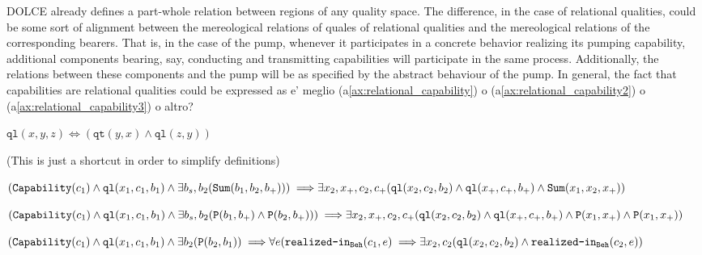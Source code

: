 \documentclass[crcready]{iosart2x}
\newcommand{\bflist}{\begin{list}{}{\setlength{\topsep}{2mm}\setlength{\partopsep}{0mm}\setlength{\parsep}{0mm}\setlength{\leftmargin}{9mm}\setlength{\labelwidth}{8mm}}}
\newcommand{\eflist}{\end{list}}
\newcommand{\AxLabel}{\textrm{a}}
\newcommand{\DefLabel}{\textrm{d}}
\newcounter{cntax}
\newcommand{\myax}[1]{\refstepcounter{cntax}\begin{small}{\bf \AxLabel\thecntax\label{ax:#1}}\end{small}}
\newcounter{cntdef}
\newcommand{\mydf}[1]{\refstepcounter{cntdef}\begin{small}{\bf \DefLabel\thecntdef\label{def:#1}}\end{small}}
\newcommand{\refax}[1]{({\AxLabel}\ref{#1})}
\newcommand{\generalStyle}[1]{\texttt{#1}}
\newcommand{\biRel}[3]{\generalStyle{#1}(#2,#3)}
\newcommand{\uniRel}[2]{\generalStyle{#1}(#2)}
\newcommand{\biRelPar}[4]{\generalStyle{#1}_{\generalStyle{#4}}(#2,#3)}
\newcommand{\triRel}[4]{\generalStyle{#1}(#2,#3,#4)}
\newcommand{\myiff}{\Longleftrightarrow}
\newcommand{\myfi}{\hspace{0.9mm} \Longrightarrow}
\newcommand{\DOLCE}{\textsc{DOLCE}\xspace} %
\newcommand{\DOLCEQualityDirect}[2]{\biRel{qt}{#1}{#2}}
\newcommand{\DOLCEQualeDirect}[2]{\biRel{{ql}}{#1}{#2}}
\newcommand{\DOLCEPart}[2]{\biRel{{P}}{#1}{#2}}
\newcommand{\DOLCESum}[3]{\triRel{Sum}{#1}{#2}{#3}}
\newcommand{\Capability}[1]{\uniRel{Capability}{#1}}
\newcommand{\realizedIn}[2]{\biRelPar{realized-in}{#1}{#2}{Beh}}
\newcommand{\behSum}[3]{\triRel{Sum}{#1}{#2}{#3}}
\newcommand{\DOLCEQualeTer}[3]{\triRel{ql}{#1}{#2}{#3}}
\newcommand{\TODO}[1]{{\color{red} #1}}
\begin{document}
\DOLCE already defines a part-whole relation between regions of 
any quality space. The difference, in the case of relational qualities, could be some sort of alignment between the mereological relations of quales of relational qualities and the mereological relations of the corresponding bearers. 
That is, in the case of the pump, whenever it participates in a concrete behavior realizing its pumping capability, additional components bearing, say, conducting and transmitting capabilities will participate in the same process. 
Additionally, the relations between these components and the pump will be as specified by the abstract behaviour of the pump. 
In general, the fact that capabilities are relational qualities could be expressed as \TODO{e' meglio \refax{ax:relational_capability} o \refax{ax:relational_capability2} o \refax{ax:relational_capability3} o altro?}
\bflist
 \item[\mydf{ternary_quale}] $ \DOLCEQualeTer{x}{y}{z} \myiff ( \DOLCEQualityDirect{y}{x} \land \DOLCEQualeDirect{z}{y} ) $
 \item[](This is just a shortcut in order to simplify definitions)
 {\color{red}
 \item[\myax{relational_capability}] $ (\Capability{c_1} \land \DOLCEQualeTer{x_1}{c_1}{b_1} \land \\ \exists b_s,b_2 (\behSum{b_1}{b_2}{b_+})) \myfi \\ \exists x_2,x_+,c_2,c_+ (\DOLCEQualeTer{x_2}{c_2}{b_2} \land \\ \DOLCEQualeTer{x_+}{c_+}{b_+} \land \DOLCESum{x_1}{x_2}{x_+})$ 
 \item[\myax{relational_capability2}] $ (\Capability{c_1} \land \DOLCEQualeTer{x_1}{c_1}{b_1} \land \\ \exists b_s,b_2 (\DOLCEPart{b_1}{b_+} \land \DOLCEPart{b_2}{b_+})) \myfi \\ \exists x_2,x_+,c_2,c_+ (\DOLCEQualeTer{x_2}{c_2}{b_2} \land \\ \DOLCEQualeTer{x_+}{c_+}{b_+} \land \DOLCEPart{x_1}{x_+} \land \DOLCEPart{x_1}{x_+})$ 
 \item[\myax{relational_capability3}] $ (\Capability{c_1} \land \DOLCEQualeTer{x_1}{c_1}{b_1} \land \\ \exists b_2 (\DOLCEPart{b_2}{b_1}) \myfi \\ \forall e( \realizedIn{c_1}{e} \myfi \exists x_2,c_2 \\ (\DOLCEQualeTer{x_2}{c_2}{b_2} \land  \realizedIn{c_2}{e})$ 
 }
\eflist
\end{document}
